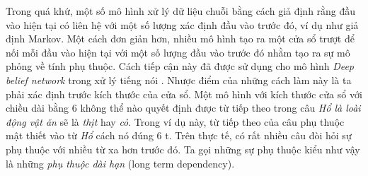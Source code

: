 Trong quá khứ, một số mô hình xử lý dữ liệu chuỗi bằng cách giả định rằng đầu vào hiện tại có liên hệ với một số lượng xác định đầu vào trước đó, ví dụ như giả định Markov. Một cách đơn giản hơn, nhiều mô hình tạo ra một cửa sổ trượt để nối mỗi đầu vào hiện tại với một số lượng đầu vào trước đó nhằm tạo ra sự mô phỏng về tính phụ thuộc. Cách tiếp cận này đã được sử dụng cho mô hình \textit{Deep belief network} trong xử lý tiếng nói \cite{massetal2012}. Nhược điểm của những cách làm này là ta phải xác định trước kích thước của cửa sổ. Một mô hình với kích thước cửa sổ với chiều dài bằng 6 không thể nào quyết định được từ tiếp theo trong câu \textit{Hổ là loài động vật ăn} sẽ là \textit{thịt} hay \textit{cỏ}. Trong ví dụ này, từ tiếp theo của câu phụ thuộc mật thiết vào từ \textit{Hổ} cách nó đúng 6 t. Trên thực tế, có rất nhiều câu đòi hỏi sự phụ thuộc với nhiều từ xa hơn trước đó. Ta gọi những sự phụ thuộc kiểu như vậy là những \textit{phụ thuộc dài hạn} (long term dependency). 

 

